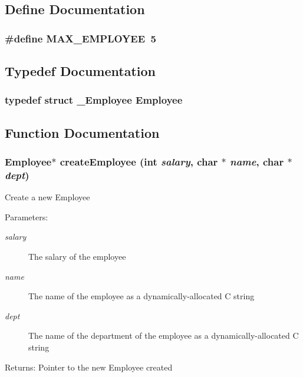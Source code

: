 \subsection{Define Documentation}
\subsubsection{\setlength{\rightskip}{0pt plus 5cm}\#define MAX\_\-EMPLOYEE~5}\label{struct_8h_ee0ebd40b7f91bd31a2fbe80930a8d51}




\subsection{Typedef Documentation}
\subsubsection{\setlength{\rightskip}{0pt plus 5cm}typedef struct \bf{\_\-Employee} \bf{Employee}}\label{struct_8h_f86d012563975d4da5c22487e31948e2}




\subsection{Function Documentation}
\subsubsection{\setlength{\rightskip}{0pt plus 5cm}\bf{Employee}$\ast$ create\-Employee (int {\em salary}, char $\ast$ {\em name}, char $\ast$ {\em dept})}\label{struct_8h_b14bf26660b983276c2788be527dd90d}


Create a new Employee \begin{Desc}
\item[Parameters:]
\begin{description}
\item[{\em salary}]The salary of the employee \item[{\em name}]The name of the employee as a dynamically-allocated C string \item[{\em dept}]The name of the department of the employee as a dynamically-allocated C string \end{description}
\end{Desc}
\begin{Desc}
\item[Returns:]Pointer to the new Employee created \end{Desc}
